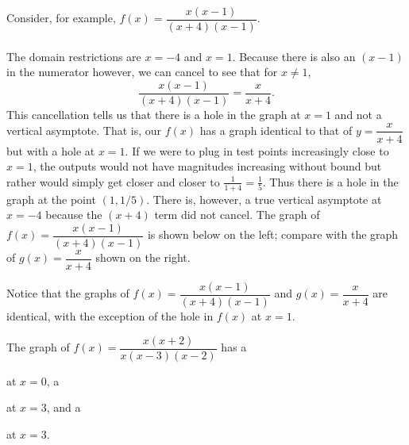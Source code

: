 \documentclass{ximera}
\begin{document}
\begin{example}
Consider, for example, $f(x)=\dfrac{x(x-1)}{(x+4)(x-1)}$.
\\
\\The domain restrictions are $x=-4$ and $x=1$. Because there is also an $(x-1)$ in the numerator however, we can cancel to see that for $x\neq 1$, 
$$\dfrac{x(x-1)}{(x+4)(x-1)}=\dfrac{x}{x+4}.$$ 
This cancellation tells us that there is a hole in the graph at $x=1$ and not a vertical asymptote. That is, our $f(x)$ has a graph identical to that of $y=\dfrac{x}{x+4}$ but with a hole at $x=1$. If we were to plug in test points increasingly close to $x=1$, the outputs would not have magnitudes increasing without bound but rather would simply get closer and closer to $\frac{1}{1+4}=\frac{1}{5}$. Thus there is a hole in the graph at the point $(1,1/5)$. There is, however, a true vertical asymptote at $x=-4$ because the $(x+4)$ term did not cancel. The graph of $f(x)=\dfrac{x(x-1)}{(x+4)(x-1)}$ is shown below on the left; compare with the graph of $g(x)=\dfrac{x}{x+4}$ shown on the right.

\begin{center}\hfill
{}\end{center}

Notice that the graphs of $f(x)=\dfrac{x(x-1)}{(x+4)(x-1)}$ and $g(x)=\dfrac{x}{x+4}$ are identical, with the exception of the hole in $f(x)$ at $x=1$.
\end{example}

\begin{example}
The graph of $f(x)=\dfrac{x(x+2)}{x(x-3)(x-2)}$ has a 
  \begin{multipleChoice}
  \end{multipleChoice} at $x=0$, a
    \begin{multipleChoice}
  \end{multipleChoice} at $x=3$, and a 
     \begin{multipleChoice}
  \end{multipleChoice} at $x=3$.
\end{example}
\end{document}
